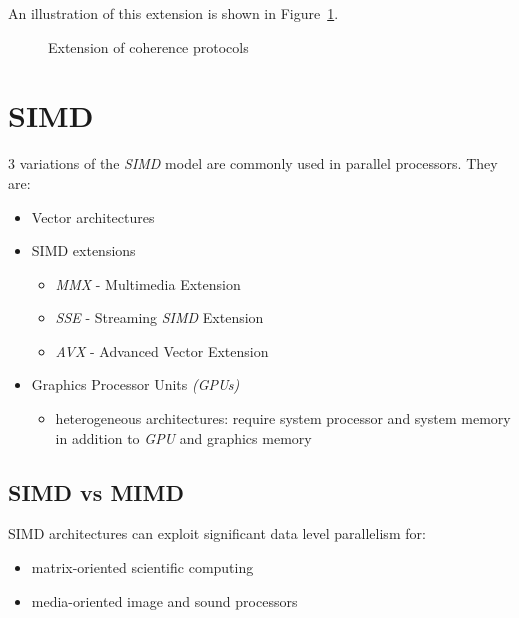 \documentclass[english]{article}
\begin{document}
\bigskip
An illustration of this extension is shown in Figure~\ref{fig:MESI-extension}.

\begin{figure}[htbp]
  \bigskip
  \centering
  \caption{Extension of coherence protocols}
  \label{fig:MESI-extension}
  \bigskip
\end{figure}

\clearpage

\section{SIMD}
\label{sec:simd}

\(3\) variations of the \textit{SIMD} model are commonly used in parallel processors.
They are:

\begin{itemize}
  \item Vector architectures
  \item SIMD extensions
        \begin{itemize}
          \item \textit{MMX} - Multimedia Extension
          \item \textit{SSE} - Streaming \textit{SIMD} Extension
          \item \textit{AVX} - Advanced Vector Extension
        \end{itemize}
  \item Graphics Processor Units \textit{(GPUs)}
        \begin{itemize}
          \item heterogeneous architectures: require system processor and system memory in addition to \textit{GPU} and graphics memory
        \end{itemize}
\end{itemize}

\subsection{SIMD vs MIMD}

SIMD architectures can exploit significant data level parallelism for:

\begin{itemize}
  \item matrix-oriented scientific computing
  \item media-oriented image and sound processors
\end{itemize}
\end{document}
